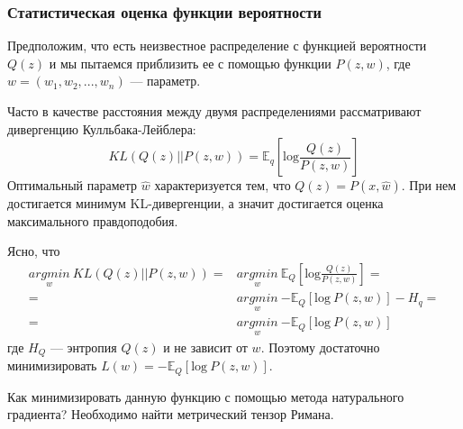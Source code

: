\documentclass[a4paper,12pt]{article}
\begin{document}
\newpage

\subsubsection{Статистическая оценка функции вероятности}

Предположим, что есть неизвестное распределение с функцией вероятности $Q(z)$ и мы пытаемся приблизить ее с помощью
функции $P(z, w)$, где $w = (w_1, w_2, ..., w_n)$ --- параметр.

Часто в качестве расстояния между двумя распределениями рассматривают дивергенцию Кулльбака-Лейблера:
$$KL(Q(z) || P(z, w)) = \mathbb{E}_q\left[\mbox{log} \frac{Q(z)}{P(z, w)}\right] $$
Оптимальный параметр $\hat{w}$ характеризуется тем, что $Q(z) = P(x, \hat{w})$. При нем достигается минимум KL-дивергенции, а значит достигается оценка максимального правдоподобия.

Ясно, что
$$ 
\begin{aligned}
    \underset{w}{argmin} ~ KL(Q(z) || P(z, w)) 
    = & \underset{w}{argmin} ~ \mathbb{E}_Q\left[\mbox{log} \frac{Q(z)}{P(z, w)}\right] = \\
    = & \underset{w}{argmin} ~ \mathbb{-E}_Q\left[\mbox{log} ~ P(z, w)\right] - H_q = \\
    = & \underset{w}{argmin} ~ \mathbb{-E}_Q\left[\mbox{log} ~ P(z, w)\right]
\end{aligned}
$$ где $H_Q$ --- энтропия $Q(z)$ и не зависит от $w$. Поэтому достаточно минимизировать $L(w) = \mathbb{-E}_Q\left[\mbox{log} ~ P(z, w)\right]$.

Как минимизировать данную функцию с помощью метода натурального градиента? Необходимо найти метрический тензор Римана.
\end{document}
